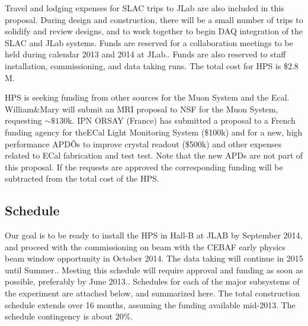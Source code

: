 Travel and lodging expenses for SLAC trips to JLab are also included in this proposal. During design and construction, there will be a small number of trips to solidify and review designs, and to work together to begin DAQ integration of the SLAC and JLab systems. Funds are reserved for a collaboration meetings to be held during calendar 2013 and 2014 at JLab.. Funds are also reserved  to staff installation, commissioning, and data taking runs. The total cost for HPS is \$2.8 M. 

HPS is seeking funding from other sources for the Muon System and the Ecal.
William\&Mary will submit an MRI proposal to NSF for the Muon System, requesting $\sim \$130$k. IPN ORSAY (France) has submitted a proposal to a French funding agency for theECal  Light Monitoring System (\$100k) and for a new, high performance  APDÕs to improve crystal readout (\$500k) and other expenses related to ECal fabrication and test test. Note that the new APDs are not part of this proposal. If the requests are approved the corresponding funding will be subtracted from the total cost of the HPS. 

\subsection{Schedule}

Our goal is to be ready to install the HPS in Hall-B at JLAB  by September 2014, and proceed with the commissioning on beam with the CEBAF early physics beam window opportunity in October 2014. The data taking will continue in 2015 until Summer.. Meeting this schedule  will require approval and funding as soon as possible, preferably by June 2013.. Schedules for each of the major subsystems of the experiment are attached below, and summarized here. The total construction schedule extends over  16 months, assuming the funding available mid-2013. The schedule contingency is about 20\%. 

